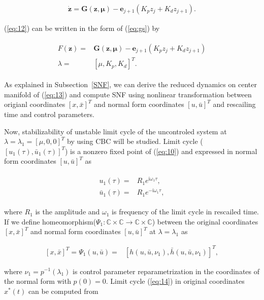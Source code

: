 \documentclass[openacc]{rsproca_new}%
\def\complex{\mathbb{C}}
\def\vec#1{\ensuremath{\mathbf{#1}}}
\newcommand{\Eref}[1]{(\ref{#1})}
\newcommand{\Ssref}[1]{Subsection~\ref{#1}}
\begin{document}
\begin{align}\label{eq:12}
    \dot{\vec{z}} =\vec{G}(\vec{z},\vec{\mu})-\vec{e}_{j+1}(K_p z_j+K_d z_{j+1}).
\end{align}

\noindent \Eref{eq:12} can be written in the form of \Eref{eq:gs} by

\begin{align}\label{eq:13}
\begin{split}
  F({\vec{z}})=&\vec{G}(\vec{z},\vec{\mu})-\vec{e}_{j+1}(K_pz_j+K_d z_{j+1})\\
  \lambda=&[\mu,K_p,K_d]^T.
\end{split}
\end{align}

\noindent As explained in \Ssref{SNF}, we can derive the reduced dynamics on center manifold of \Eref{eq:13} and compute SNF using nonlinear transformation between origianl coordinates $[x,\bar x]^T$ and normal form coordinates $[u,\bar u]^T$ and rescailing time and control parameters.

Now, stabilizability of unstable limit cycle of the uncontroled system at $\lambda=\lambda_1=[\mu,0,0]^T$ by using CBC will be studied. Limit cycle ($[u_1(\tau),\bar u_1(\tau)]^T$) is a nonzero fixed point of \Eref{eq:10} and expressed in normal form coordinates $[u,\bar u]^T$ as

\begin{align}\label{eq:14}
  \begin{split}
      u_1(\tau)=&R_1e^{\textrm{i}\omega_1 \tau},\\
      \bar u_1(\tau)=&R_1e^{-\textrm{i}\omega_1 \tau},
    \end{split}
\end{align}

\noindent where $R_1$ is the amplitude and $\omega_1$ is frequency of the limit cycle in rescailed time. If we define homeomorphism($\Psi_1:\complex\times\complex\rightarrow\complex\times\complex$) between the original coordinates $[x,\bar x]^T$ and normal form coordinates $[u,\bar u]^T$ at $\lambda=\lambda_1$ as

\begin{align}\label{eq:15}
    [x,\bar x]^T=\Psi_1(u,\bar u)=&[h(u,\bar u,\nu_1),\bar h(u,\bar u,\nu_1)]^T,
\end{align}

\noindent  where $\nu_1=p^{-1}(\lambda_1)$ is control parameter reparametrization in the coordinates of the normal form with $p(0)=0$. Limit cycle \Eref{eq:14} in original coordinates $x^*(t)$ can be computed from
\end{document}
